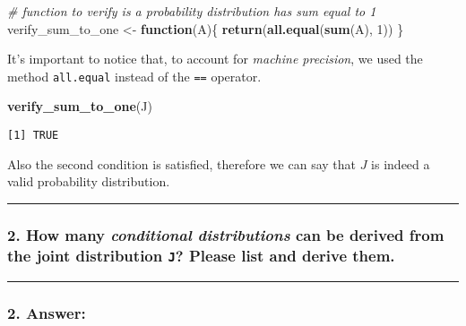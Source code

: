 \documentclass[
]{article}
\newenvironment{Shaded}{\begin{snugshade}}{\end{snugshade}}
\newcommand{\CommentTok}[1]{\textcolor[rgb]{0.56,0.35,0.01}{\textit{#1}}}
\newcommand{\ControlFlowTok}[1]{\textcolor[rgb]{0.13,0.29,0.53}{\textbf{#1}}}
\newcommand{\DecValTok}[1]{\textcolor[rgb]{0.00,0.00,0.81}{#1}}
\newcommand{\FunctionTok}[1]{\textcolor[rgb]{0.13,0.29,0.53}{\textbf{#1}}}
\newcommand{\NormalTok}[1]{#1}
\newcommand{\OtherTok}[1]{\textcolor[rgb]{0.56,0.35,0.01}{#1}}
\begin{document}
\begin{Shaded}
\begin{Highlighting}[]
\CommentTok{\# function to verify is a probability distribution has sum equal to 1}
\NormalTok{verify\_sum\_to\_one }\OtherTok{\textless{}{-}} \ControlFlowTok{function}\NormalTok{(A)\{}
  \FunctionTok{return}\NormalTok{(}\FunctionTok{all.equal}\NormalTok{(}\FunctionTok{sum}\NormalTok{(A), }\DecValTok{1}\NormalTok{))}
\NormalTok{\}}
\end{Highlighting}
\end{Shaded}

It's important to notice that, to account for \emph{machine precision},
we used the method \texttt{all.equal} instead of the \texttt{==}
operator.

\begin{Shaded}
\begin{Highlighting}[]
\FunctionTok{verify\_sum\_to\_one}\NormalTok{(J)}
\end{Highlighting}
\end{Shaded}

\begin{verbatim}
[1] TRUE
\end{verbatim}

Also the second condition is satisfied, therefore we can say that \(J\)
is indeed a valid probability distribution.

\begin{center}\rule{0.5\linewidth}{0.5pt}\end{center}

\bigskip

\hypertarget{how-many-conditional-distributions-can-be-derived-from-the-joint-distribution-j-please-list-and-derive-them.}{%
\subsubsection{\texorpdfstring{2. How many \emph{conditional
distributions} can be derived from the joint distribution \texttt{J}?
Please list and derive
them.}{2. How many conditional distributions can be derived from the joint distribution J? Please list and derive them.}}\label{how-many-conditional-distributions-can-be-derived-from-the-joint-distribution-j-please-list-and-derive-them.}}

\begin{center}\rule{0.5\linewidth}{0.5pt}\end{center}

\hypertarget{answer-1}{%
\subsubsection{2. Answer:}\label{answer-1}}
\end{document}
